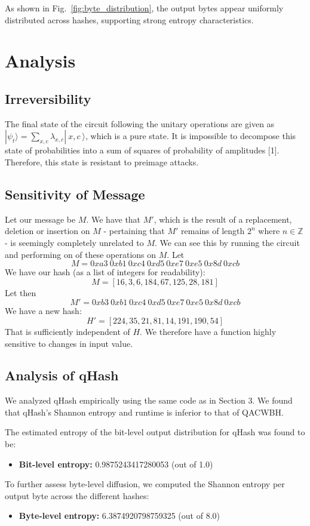\documentclass[conference]{IEEEtran}
\begin{document}
As shown in Fig.~\ref{fig:byte_distribution}, the output bytes appear uniformly distributed across hashes, supporting strong entropy characteristics.

\section{Analysis}
\subsection{Irreversibility}
The final state of the circuit following the unitary operations are given as $|\psi_{t}\rangle=\sum_{x,c}\lambda_{x,c}|\ x,c \ \rangle$, which is a pure state. It is impossible to decompose this state of probabilities into a sum of squares of probability of amplitudes [1]. Therefore, this state is resistant to preimage attacks. 
\subsection{Sensitivity of Message}
Let our message be $M$. We have that $M'$, which is the result of a replacement, deletion or insertion on $M$ - pertaining that $M'$ remains of length $2^n$ where $n\in \mathbb{Z}$ - is seemingly completely unrelated to $M$. We can see this by running the circuit and performing on of these operations on $M$. Let
\[M = 0xa3 \  0xb1 \  0xc4 \  0xd5 \  0xe7 \  0xe5 \  0x8d \ 0xcb\]
We have our hash (as a list of integers for readability):
\[M = [16, 3, 6, 184, 67, 125, 28, 181]\]
Let then 
\[M' = 0xb3 \  0xb1 \  0xc4 \  0xd5 \  0xe7 \  0xe5 \  0x8d \  0xcb\]
We have a new hash:
\[H' = [224, 35, 21, 81, 14, 191, 190, 54]\]
That is sufficiently independent of $H$. We therefore have a function highly sensitive to changes in input value.

\subsection{Analysis of qHash}
We analyzed qHash empirically using the same code as in Section 3. We found that qHash's Shannon entropy and runtime is inferior to that of QACWBH. 

The estimated entropy of the bit-level output distribution for qHash was found to be:
\begin{itemize}
    \item \textbf{Bit-level entropy:} 0.9875243417280053 (out of 1.0)
\end{itemize}

To further assess byte-level diffusion, we computed the Shannon entropy per output byte across the different hashes:
\begin{itemize}
    \item \textbf{Byte-level entropy:}  6.3874920798759325 (out of 8.0)
\end{itemize}
\end{document}
